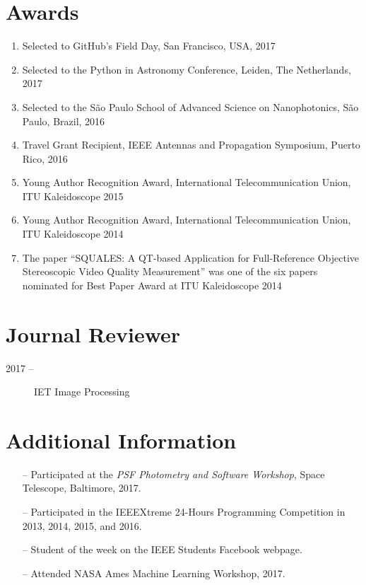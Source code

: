 \documentclass[10pt]{article}
\begin{document}
\begin{titlepage}
\section{Awards}
\begin{enumerate}
  \item Selected to GitHub's Field Day, San Francisco, USA, 2017
  \item Selected to the Python in Astronomy Conference, Leiden, The Netherlands, 2017
  \item Selected to the S\~ao Paulo School of Advanced Science on Nanophotonics, S\~ao Paulo, Brazil, 2016
  \item Travel Grant Recipient, IEEE Antennas and Propagation Symposium, Puerto Rico, 2016
  \item Young Author Recognition Award, International Telecommunication Union, ITU Kaleidoscope 2015
  \item Young Author Recognition Award, International Telecommunication Union, ITU Kaleidoscope 2014
  \item The paper ``SQUALES: A QT-based Application for Full-Reference Objective Stereoscopic Video Quality Measurement'' was one of the six papers nominated for Best Paper Award at ITU Kaleidoscope 2014
\end{enumerate}

\section{Journal Reviewer}

\begin{description}
    \item[2017 --] IET Image Processing
\end{description}

\section{Additional Information}
\begin{itemize}
    \item[--] Participated at the \textit{PSF Photometry and Software Workshop}, Space Telescope, Baltimore, 2017.
    \item[--] Participated in the IEEEXtreme 24-Hours Programming Competition in 2013, 2014, 2015, and 2016.
    \item[--] Student of the week on the IEEE Students Facebook webpage.
    \item[--] Attended NASA Ames Machine Learning Workshop, 2017.
\end{itemize}

\end{titlepage}
\end{document}
